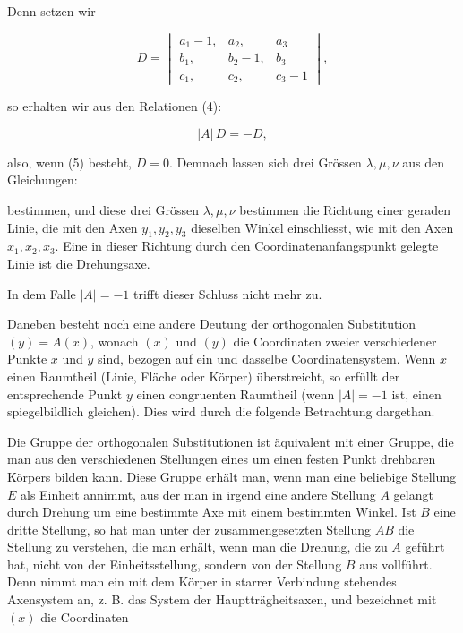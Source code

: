 Denn setzen wir

\[
D = \begin{vmatrix} a_1 - 1, & a_2, & a_3\\ b_1, & b_2 - 1, & b_3\\ c_1, & c_2, & c_3 - 1 \end{vmatrix},
\]

so erhalten wir aus den Relationen (4):

\[
|A|\, D = - D,
\]

also, wenn (5) besteht, $D = 0$. Demnach lassen sich drei
Gr\"ossen $\lambda, \mu, \nu$ aus den Gleichungen:


bestimmen, und diese drei Gr\"ossen $\lambda, \mu, \nu$ bestimmen die Richtung einer geraden Linie, die mit den Axen $y_1, y_2, y_3$ dieselben
Winkel einschliesst, wie mit den Axen $x_1, x_2, x_3$. Eine in dieser
Richtung durch den Coordinatenanfangspunkt gelegte Linie ist
die Drehungsaxe.

In dem Falle $|A| = - 1$ trifft dieser Schluss nicht mehr zu.

Daneben besteht noch eine andere Deutung der orthogonalen
Substitution $(y) = A (x)$, wonach $(x)$ und $(y)$ die Coordinaten
zweier verschiedener Punkte $x$ und $y$ sind, bezogen auf ein und
dasselbe Coordinatensystem. Wenn $x$ einen Raumtheil (Linie,
Fl\"ache oder K\"orper) \"uberstreicht, so erf\"ullt der entsprechende
Punkt $y$ einen congruenten Raumtheil (wenn $|A| = - 1$ ist, einen
spiegelbildlich gleichen). Dies wird durch die folgende Betrachtung dargethan.

Die Gruppe der  orthogonalen Substitutionen
ist \"aquivalent mit einer Gruppe, die man aus den verschiedenen
Stellungen eines um einen festen Punkt drehbaren K\"orpers bilden
kann. Diese Gruppe erh\"alt man, wenn man eine beliebige Stellung $E$ als Einheit annimmt, aus der man in irgend eine andere
Stellung $A$ gelangt durch Drehung um eine bestimmte Axe mit
einem bestimmten Winkel. Ist $B$ eine dritte Stellung, so hat
man unter der zusammengesetzten Stellung $AB$ die Stellung zu
verstehen, die man erh\"alt, wenn man die Drehung, die zu $A$
gef\"uhrt hat, nicht von der Einheitsstellung, sondern von der
Stellung $B$ aus vollf\"uhrt. Denn nimmt man ein mit dem K\"orper
in starrer Verbindung stehendes Axensystem an, z. B. das System
der Haupttr\"agheitsaxen, und bezeichnet mit $(x)$ die Coordinaten
